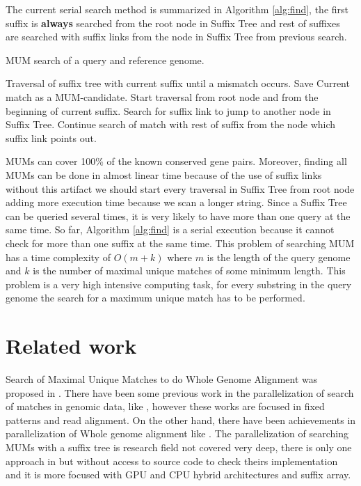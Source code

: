 \documentclass[3p,times]{elsarticle}
\begin{document}
 The current serial search method is summarized in Algorithm \ref{alg:find}, the first suffix is \textbf{always} searched from the root node in Suffix Tree and rest of suffixes are searched with suffix links from the node in Suffix Tree from previous search.\\
 \begin{algorithm}
   \caption{MUM search of a query and reference genome.} \label{alg:find}
 \begin{algorithmic}[1]
   \State Traversal of suffix tree with current suffix until a mismatch occurs.
   \State Save Current match as a MUM-candidate. 
   \EndIf
   \State Start traversal from root node and from the beginning of current suffix.
   \State Search for suffix link to jump to another node in Suffix Tree.
   \State Continue search of match with rest of suffix from the node which suffix link points out.
   \EndIf
   \EndFor
 \end{algorithmic}
 \end{algorithm}
 MUMs can cover 100\% of the known  conserved gene pairs. Moreover, finding all MUMs  can be done in almost linear time because of the use of suffix links without this artifact we should start every traversal in Suffix Tree from root node adding more execution time because we scan a longer string. Since a Suffix Tree can be queried several times, it is very likely to have more than one query  at the same time. So far, Algorithm \ref{alg:find} is a serial execution because it cannot check for more than one suffix at the same time.
This problem of searching MUM has a time complexity of $O(m+k)$ where $m$ is the length of the query genome and $k$ is the number of maximal unique matches of some minimum length. This problem is a very high intensive computing task, for every substring in the query genome the search for a maximum unique match has to be performed.
\section{Related work}
Search of Maximal Unique Matches to do Whole Genome Alignment was proposed in \cite{Delcher1999}. There have been some previous work in the parallelization of search of matches in genomic data, like \cite{OguzhanKulekci2011,Mongelli,Kouzinopoulos2005}, however these works are focused in fixed patterns and read alignment. On the other hand, there have been achievements in parallelization of Whole genome alignment like \cite{Meng2005}. The parallelization of searching MUMs with a suffix tree is research field not covered very deep, there is only one approach in \cite{Encarnac2011} but without access to source code to check theirs implementation and it is more focused with GPU and CPU hybrid architectures and suffix array.
\end{document}
